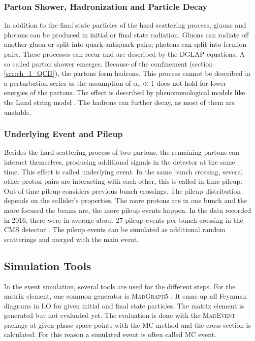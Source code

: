 \subsubsection*{Parton Shower, Hadronization and Particle Decay}
In addition to the final state particles of the hard scattering process, gluons and photons can be produced in initial or final state radiation. Gluons can radiate off another gluon or split into quark-antiquark pairs; photons can split into fermion pairs. These processes can recur and are described by the DGLAP-equations. A so called parton shower emerges. Because of the confinement (section \ref{sec:ch_1_QCD}), the partons form hadrons. This process cannot be described in a perturbation series as the assumption of $\alpha_s \ll 1$ does not hold for lower energies of the partons. The effect is described by phenomenological models like the Lund string model \cite{LundString}. The hadrons can further decay, as most of them are unstable. 

\subsubsection*{Underlying Event and Pileup}
Besides the hard scattering process of two partons, the remaining partons can interact themselves, producing additional signals in the detector at the same time. This effect is called underlying event. In the same bunch crossing, several other proton pairs are interacting with each other, this is called in-time pileup. Out-of-time pileup considers previous bunch crossings. The pileup distribution depends on the collider's properties. The more protons are in one bunch and the more focused the beams are, the more pileup events happen. In the data recorded in 2016, there were in average about 27 pileup events per bunch crossing in the CMS detector \cite{lhclumi2016}. The pileup events can be simulated as additional random scatterings and merged with the main event. 

\subsection{Simulation Tools} \label{sec:ch_3_simtools}
In the event simulation, several tools are used for the different steps. For the matrix element, one common generator is \textsc{MadGraph5} \cite{MadGraph5}. It sums up all Feynman diagrams in LO for given initial and final state particles. The matrix element is generated but not evaluated yet. The evaluation is done with the \textsc{MadEvent} package \cite{MadEvent} at given phase space points with the MC method and the cross section is calculated. For this reason a simulated event is often called MC event. \\

